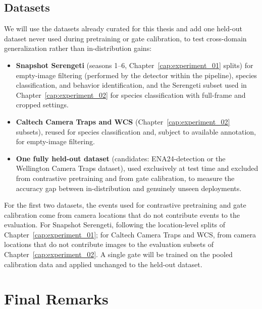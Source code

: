 \subsection{Datasets}\label{sec:datasets}

We will use the datasets already curated for this thesis and add one held-out dataset never used during pretraining or gate calibration, to test cross-domain generalization rather than in-distribution gains:

\begin{itemize}
\item \textbf{Snapshot Serengeti} (seasons 1--6, Chapter~\ref{cap:experiment_01} splits) for empty-image filtering (performed by the detector within the pipeline), species classification, and behavior identification, and the Serengeti subset used in Chapter~\ref{cap:experiment_02} for species classification with full-frame and cropped settings.
\item \textbf{Caltech Camera Traps and WCS} (Chapter~\ref{cap:experiment_02} subsets), reused for species classification and, subject to available annotation, for empty-image filtering.
\item \textbf{One fully held-out dataset} (candidates: ENA24-detection or the Wellington Camera Traps dataset), used exclusively at test time and excluded from contrastive pretraining and from gate calibration, to measure the accuracy gap between in-distribution and genuinely unseen deployments.
\end{itemize}

For the first two datasets, the events used for contrastive pretraining and gate calibration come from camera locations that do not contribute events to the evaluation. For Snapshot Serengeti, following the location-level splits of Chapter~\ref{cap:experiment_01}; for Caltech Camera Traps and WCS, from camera locations that do not contribute images to the evaluation subsets of Chapter~\ref{cap:experiment_02}. A single gate will be trained on the pooled calibration data and applied unchanged to the held-out dataset.

\section{Final Remarks}

